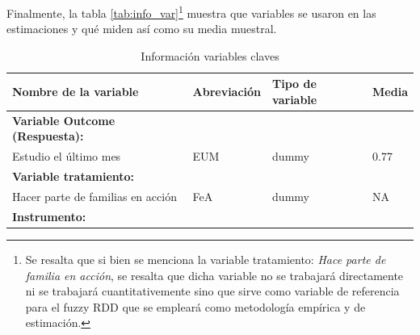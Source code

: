 \documentclass[AER]{AEA}
\begin{document}
Finalmente, la tabla \ref{tab:info_var}\footnote{Se resalta que si bien se menciona la variable tratamiento: \textit{Hace parte de familia en acción}, se resalta que dicha variable no se trabajará directamente ni se trabajará cuantitativemente sino que sirve como variable de referencia para el fuzzy RDD que se empleará como metodología empírica y de estimación.} muestra que variables se usaron en las estimaciones y qué miden así como su media muestral. 



\begin{table}[h]
\centering
\caption{Información variables claves}
\begin{tabular}{llll}
\hline
\hline
\textbf{Nombre de la variable}                                                                                                                                                                                                       & \textbf{Abreviación} & \textbf{Tipo de variable} & \textbf{Media} \\ \hline
\textbf{Variable Outcome (Respuesta):}                                                                                                                                                                                               &                      &                           &                \\
Estudio el último mes                                                                                                                                                                                                                   & EUM                  & dummy                     & 0.77           \\
\textbf{Variable tratamiento:}                                                                                                                                                                                                       &                      &                           &                \\
Hacer parte de familias en acción                                                                                                                                                                                                     & FeA                  & dummy                     & NA             \\
\textbf{Instrumento:}                                                                                                                                                                                                                &                      &                           &                \\

\end{tabular}
\end{table}
\end{document}
